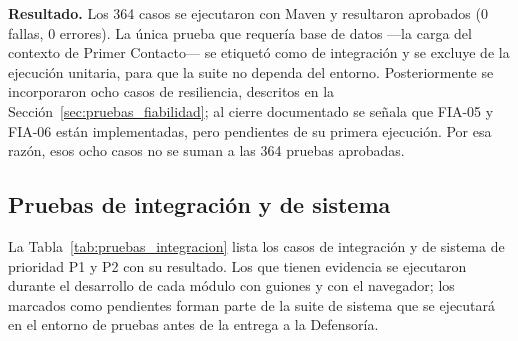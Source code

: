 	\textbf{Resultado.} Los 364 casos se ejecutaron con Maven y resultaron aprobados (0 fallas, 0
	errores). La única prueba que requería base de datos ---la carga del contexto de Primer Contacto---
	se etiquetó como de integración y se excluye de la ejecución unitaria, para que la suite no dependa
	del entorno. Posteriormente se incorporaron ocho casos de resiliencia, descritos en la
	Sección~\ref{sec:pruebas_fiabilidad}; al cierre documentado se señala que
	FIA-05 y FIA-06 están implementadas, pero pendientes de su primera ejecución.
	Por esa razón, esos ocho casos no se suman a las 364 pruebas aprobadas.

	\subsection{Pruebas de integración y de sistema}
	La Tabla~\ref{tab:pruebas_integracion} lista los casos de integración y de sistema de prioridad P1 y
	P2 con su resultado. Los que tienen evidencia se ejecutaron durante el desarrollo de cada módulo con
	guiones y con el navegador; los marcados como pendientes forman parte de la suite de sistema que se
	ejecutará en el entorno de pruebas antes de la entrega a la Defensoría.

